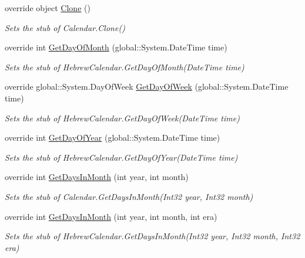 \begin{DoxyCompactItemize}
override object \hyperlink{class_system_1_1_globalization_1_1_fakes_1_1_stub_hebrew_calendar_aa100acfa41560a45768134992a072551}{Clone} ()
\begin{DoxyCompactList}\small\item\em Sets the stub of Calendar.\-Clone()\end{DoxyCompactList}\item 
override int \hyperlink{class_system_1_1_globalization_1_1_fakes_1_1_stub_hebrew_calendar_a6599ed3a4ca179b79bed71ceed9d7ad5}{Get\-Day\-Of\-Month} (global\-::\-System.\-Date\-Time time)
\begin{DoxyCompactList}\small\item\em Sets the stub of Hebrew\-Calendar.\-Get\-Day\-Of\-Month(\-Date\-Time time)\end{DoxyCompactList}\item 
override global\-::\-System.\-Day\-Of\-Week \hyperlink{class_system_1_1_globalization_1_1_fakes_1_1_stub_hebrew_calendar_a244e9a164e0e01be89429be2a9291777}{Get\-Day\-Of\-Week} (global\-::\-System.\-Date\-Time time)
\begin{DoxyCompactList}\small\item\em Sets the stub of Hebrew\-Calendar.\-Get\-Day\-Of\-Week(\-Date\-Time time)\end{DoxyCompactList}\item 
override int \hyperlink{class_system_1_1_globalization_1_1_fakes_1_1_stub_hebrew_calendar_a42f6863b99bae177d2d2f1440f893881}{Get\-Day\-Of\-Year} (global\-::\-System.\-Date\-Time time)
\begin{DoxyCompactList}\small\item\em Sets the stub of Hebrew\-Calendar.\-Get\-Day\-Of\-Year(\-Date\-Time time)\end{DoxyCompactList}\item 
override int \hyperlink{class_system_1_1_globalization_1_1_fakes_1_1_stub_hebrew_calendar_ac9072fa890a1707c44b1a624a4c4f9cd}{Get\-Days\-In\-Month} (int year, int month)
\begin{DoxyCompactList}\small\item\em Sets the stub of Calendar.\-Get\-Days\-In\-Month(\-Int32 year, Int32 month)\end{DoxyCompactList}\item 
override int \hyperlink{class_system_1_1_globalization_1_1_fakes_1_1_stub_hebrew_calendar_acb025fbb7a8feff8ab489c431c68831f}{Get\-Days\-In\-Month} (int year, int month, int era)
\begin{DoxyCompactList}\small\item\em Sets the stub of Hebrew\-Calendar.\-Get\-Days\-In\-Month(\-Int32 year, Int32 month, Int32 era)\end{DoxyCompactList}\item 

\end{DoxyCompactItemize}
